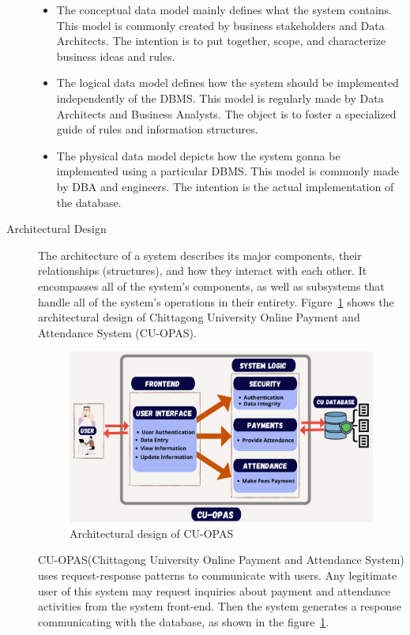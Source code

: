 \begin{description}
\begin{itemize}
  \item The conceptual data model mainly defines what the system contains. This model is commonly created by business stakeholders and Data Architects. The intention is to put together, scope, and characterize business ideas and rules.
  \item The logical data model defines how the system should be implemented independently of the DBMS. This model is regularly made by Data Architects and Business Analysts. The object is to foster a specialized guide of rules and information structures.
  \item The physical data model depicts how the system gonna be implemented using a particular DBMS. This model is commonly made by DBA and engineers. The intention is the actual implementation of the database.
\end{itemize}
\item[Architectural Design] The architecture of a system describes its major components, their relationships (structures), and how they interact with each other. It encompasses all of the system's components, as well as subsystems that handle all of the system's operations in their entirety. Figure~\ref{fig:archi} shows the architectural design of Chittagong University Online Payment and Attendance System (CU-OPAS).

\begin{figure}[H]
    \centering
    \includegraphics[width=1\textwidth]{images/archi}
    \caption{Architectural design of CU-OPAS}
    \label{fig:archi}
\end{figure}

CU-OPAS(Chittagong University Online Payment and Attendance System) uses request-response patterns to communicate with users. Any legitimate user of this system may request inquiries about payment and attendance activities from the system front-end. Then the system generates a response communicating with the database, as shown in the figure~\ref{fig:archi}.


\end{description}
